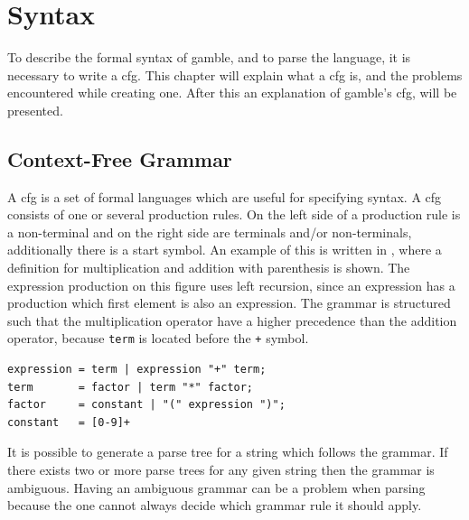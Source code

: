 \chapter{Syntax}\label{chap:syntax}

To describe the formal syntax of \gls{gamble}, and to parse the language, it is necessary to write a \acrfull{cfg}.
This chapter will explain what a \acrshort{cfg} is, and the problems encountered while creating one.
After this an explanation of \gls{gamble}'s \acrshort{cfg}, will be presented.

\section{Context-Free Grammar}\label{sec:cfg}
A \acrshort{cfg} is a set of formal languages which are useful for specifying syntax. 
A \acrshort{cfg} consists of one or several production rules.
On the left side of a production rule is a non-terminal and on the right side are terminals and/or non-terminals, additionally there is a start symbol.
An example of this is written in , where a definition for multiplication and addition with parenthesis is shown.
The expression production on this figure uses left recursion, since an expression has a production which first element is also an expression.
The grammar is structured such that the multiplication operator have a higher precedence than the addition operator, because \texttt{term} is located before the \texttt{+} symbol.

\begin{lstlisting}[caption={An example of a \acrshort{cfg} written in \acrshort{ebnf}, with \acrshort{regex} for defining numbers. },frame=tlrb,label={lst:cfglst1},numbers=none]
expression = term | expression "+" term;
term       = factor | term "*" factor;
factor     = constant | "(" expression ")";
constant   = [0-9]+
\end{lstlisting}

It is possible to generate a parse tree for a string which follows the grammar. 
If there exists two or more parse trees for any given string then the grammar is ambiguous. 
Having an ambiguous grammar can be a problem when parsing because the one cannot always decide which grammar rule it should apply.


